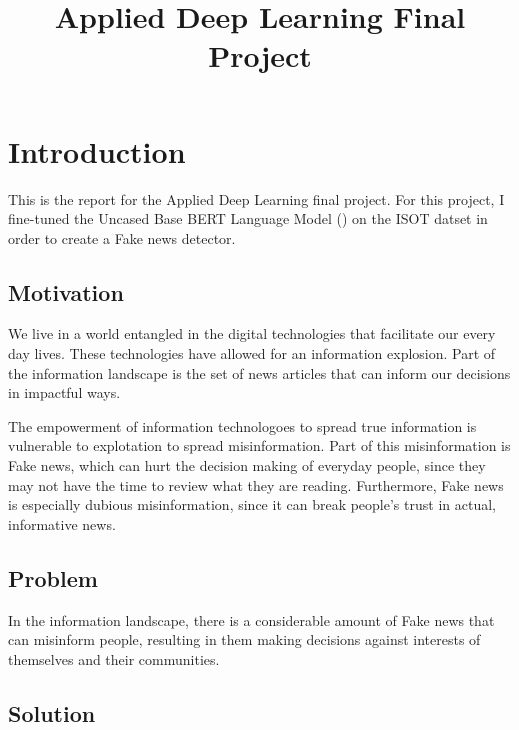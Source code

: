 \documentclass[conference]{IEEEtran}
\begin{document}
\title{Applied Deep Learning Final Project\\}

\author{
}

\maketitle

\section{Introduction}
This is the report for the Applied Deep Learning final project. For this project, I fine-tuned the Uncased Base BERT Language Model (\cite{bert_paper}) on the ISOT datset in order to create a Fake news detector.

\subsection{Motivation}
We live in a world entangled in the digital technologies that facilitate our every day lives. These technologies have allowed for an information explosion. Part of the information landscape is the set of news articles that can inform our decisions in impactful ways. 

The empowerment of information technologoes to spread true information is vulnerable to explotation to spread misinformation.  Part of this misinformation is Fake news, which can hurt the decision making of everyday people, since they may not have the time to review what they are reading. Furthermore, Fake news is especially dubious misinformation, since it can break people's trust in actual, informative news.

\subsection{Problem}

In the information landscape, there is a considerable amount of Fake news that can misinform people, resulting in them making decisions against interests of themselves and their communities.

\subsection{Solution}
\end{document}
